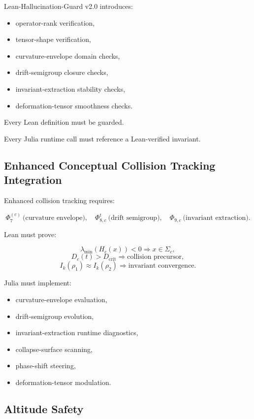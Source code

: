 Lean-Hallucination-Guard v2.0 introduces:

\begin{itemize}
  \item operator-rank verification,
  \item tensor-shape verification,
  \item curvature-envelope domain checks,
  \item drift-semigroup closure checks,
  \item invariant-extraction stability checks,
  \item deformation-tensor smoothness checks.
\end{itemize}

Every Lean definition must be guarded.

Every Julia runtime call must reference a Lean-verified invariant.

\subsection{Enhanced Conceptual Collision Tracking Integration}

Enhanced collision tracking requires:

\[
\Phi_7^{(c)}\ \text{(curvature envelope)},\quad
\Phi_{8,c}^t\ \text{(drift semigroup)},\quad
\Phi_{9,c}\ \text{(invariant extraction)}.
\]

Lean must prove:

\[
\lambda_{\min}(H_c(x)) < 0 \Rightarrow x \in \Sigma_c,
\]
\[
D_c(t) > D_{\text{crit}} \Rightarrow \text{collision precursor},
\]
\[
I_k(\rho_1) \approx I_k(\rho_2) \Rightarrow \text{invariant convergence}.
\]

Julia must implement:

\begin{itemize}
  \item curvature-envelope evaluation,
  \item drift-semigroup evolution,
  \item invariant-extraction runtime diagnostics,
  \item collapse-surface scanning,
  \item phase-shift steering,
  \item deformation-tensor modulation.
\end{itemize}

\subsection{Altitude Safety}

